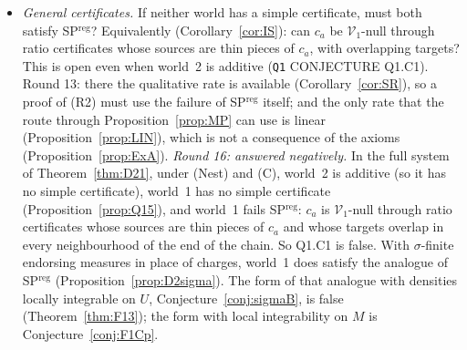 \documentclass[11pt]{article}
\theoremstyle{definition}
\theoremstyle{remark}
\newcommand{\src}[1]{\texttt{#1}}
\begin{document}
\begin{itemize}[leftmargin=*]
\item[\textbf{(R2)}] \emph{General certificates.} If neither world has a simple certificate, must both satisfy SP$^{\mathrm{reg}}$? Equivalently (Corollary~\ref{cor:IS}): can $c_a$ be $\mathcal V_1$-null through ratio certificates whose sources are thin pieces of $c_a$, with overlapping targets? This is open even when world~2 is additive (\src{Q1} CONJECTURE Q1.C1). Round 13: there the qualitative rate is available (Corollary~\ref{cor:SR}), so a proof of (R2) must use the failure of SP$^{\mathrm{reg}}$ itself; and the only rate that the route through Proposition~\ref{prop:MP} can use is linear (Proposition~\ref{prop:LIN}), which is not a consequence of the axioms (Proposition~\ref{prop:ExA}). \emph{Round 16: answered negatively.} In the full system of Theorem~\ref{thm:D21}, under (Nest) and (C), world~2 is additive (so it has no simple certificate), world~1 has no simple certificate (Proposition~\ref{prop:Q15}), and world~1 fails SP$^{\mathrm{reg}}$: $c_a$ is $\mathcal V_1$-null through ratio certificates whose sources are thin pieces of $c_a$ and whose targets overlap in every neighbourhood of the end of the chain. So Q1.C1 is false. With $\sigma$-finite endorsing measures in place of charges, world~1 does satisfy the analogue of SP$^{\mathrm{reg}}$ (Proposition~\ref{prop:D2sigma}). The form of that analogue with densities locally integrable on $U$, Conjecture~\ref{conj:sigmaB}, is false (Theorem~\ref{thm:F13}); the form with local integrability on $M$ is Conjecture~\ref{conj:F1Cp}.

\end{itemize}
\end{document}
